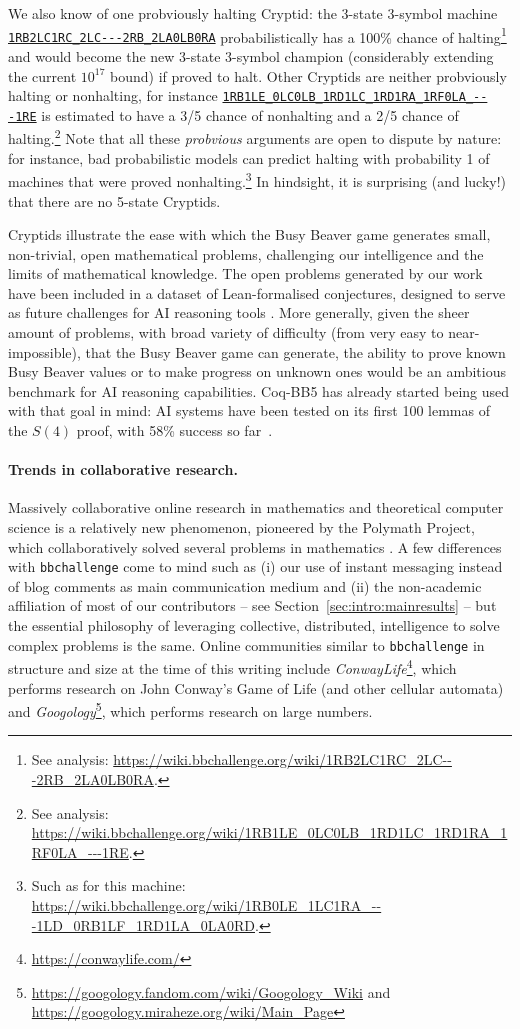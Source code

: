 \documentclass[a4paper,british]{article}
\theoremstyle{definition} %
\numberwithin{equation}{section}
\theoremstyle{definition} %
\newcommand{\tm}[1]{\href{https://bbchallenge.org/#1}{\texttt{\nolinkurl{#1}}}}
\newcommand{\CoqBB}{Coq-BB5\xspace}
\begin{document}
We also know of one probviously halting Cryptid: the 3-state 3-symbol machine \tm{1RB2LC1RC_2LC---2RB_2LA0LB0RA} probabilistically has a 100\% chance of halting\footnote{See analysis: {\scriptsize \url{https://wiki.bbchallenge.org/wiki/1RB2LC1RC_2LC---2RB_2LA0LB0RA}}.} and would become the new 3-state 3-symbol champion (considerably extending the current $10^{17}$ bound) if proved to halt. Other Cryptids are neither probviously halting or nonhalting, for instance \tm{1RB1LE_0LC0LB_1RD1LC_1RD1RA_1RF0LA_---1RE} is estimated to have a 3/5 chance of nonhalting and a 2/5 chance of halting.\footnote{See analysis: {\scriptsize \url{https://wiki.bbchallenge.org/wiki/1RB1LE_0LC0LB_1RD1LC_1RD1RA_1RF0LA_---1RE}}.} Note that all these \textit{probvious} arguments are open to dispute by nature: for instance, bad probabilistic models can predict halting with probability 1 of machines that were proved nonhalting.\footnote{Such as for this machine: \url{https://wiki.bbchallenge.org/wiki/1RB0LE_1LC1RA_---1LD_0RB1LF_1RD1LA_0LA0RD}.} In hindsight, it is surprising (and lucky!) that there are no 5-state Cryptids.

Cryptids illustrate the ease with which the Busy Beaver game generates small, non-trivial, open mathematical problems, challenging our intelligence and the limits of mathematical knowledge. The open problems generated by our work have been included in a dataset of Lean-formalised conjectures, designed to serve as future challenges for AI reasoning tools \cite{google-deepmind-formal-conjectures}. More generally, given the sheer amount of problems, with broad variety of difficulty (from very easy to near-impossible), that the Busy Beaver game can generate, the ability to prove known Busy Beaver values or to make progress on unknown ones would be an ambitious benchmark for AI reasoning capabilities. \CoqBB has already started being used with that goal in mind: AI systems have been tested on its first 100 lemmas of the $S(4)$ proof, with 58\% success so far~\cite{teodorescu2024nlir}.

\paragraph{Trends in collaborative research.} Massively collaborative online research in mathematics and theoretical computer science is a relatively new phenomenon, pioneered by the Polymath Project, which collaboratively solved several problems in mathematics \cite{Gowers2009}. A few differences with \texttt{bbchallenge} come to mind such as (i) our use of instant messaging instead of blog comments as main communication medium and (ii) the non-academic affiliation of most of our contributors -- see Section~\ref{sec:intro:mainresults} -- but the essential philosophy of leveraging collective, distributed, intelligence to solve complex problems is the same. Online communities similar to \texttt{bbchallenge} in structure and size at the time of this writing include \textit{ConwayLife}\footnote{\url{https://conwaylife.com/}}, which performs research on John Conway's Game of Life (and other cellular automata) and \textit{Googology}\footnote{\url{https://googology.fandom.com/wiki/Googology_Wiki} and \url{https://googology.miraheze.org/wiki/Main_Page}}, which performs research on large numbers.
\end{document}
